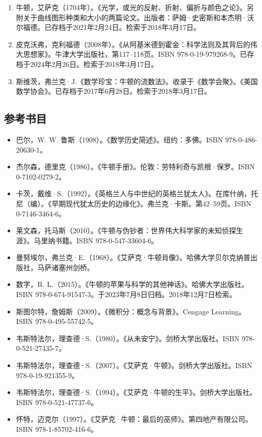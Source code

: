 \begin{enumerate}
\item 牛顿，艾萨克（1704年）。《光学，或光的反射、折射、偏折与颜色之论》。另附关于曲线图形种类和大小的两篇论文。出版者：萨姆·史密斯和本杰明·沃尔福德。已存档于2021年2月24日。检索于2018年3月17日。  
\item 皮克沃弗，克利福德（2008年）。《从阿基米德到霍金：科学法则及其背后的伟大思想家》。牛津大学出版社，第117–118页。ISBN 978-0-19-979268-9。已存档于2024年2月26日。检索于2018年3月17日。  
\item 斯维茨，弗兰克·J.《数学珍宝：牛顿的流数法》。收录于《数学会聚》。《美国数学协会》。已存档于2017年6月28日。检索于2018年3月17日。
\end{enumerate}
\subsection{参考书目}
\begin{itemize}
\item 巴尔，W. W. 鲁斯（1908）。《数学历史简述》。纽约：多佛。ISBN 978-0-486-20630-1。  
\item 杰尔森，德里克（1986）。《牛顿手册》。伦敦：劳特利奇与凯根·保罗。ISBN 0-7102-0279-2。  
\item 卡茨，戴维·S.（1992）。《英格兰人与中世纪的英格兰犹太人》。在库什纳，托尼（编）。《早期现代犹太历史的边缘化》。弗兰克·卡斯。第42–59页。ISBN 0-7146-3464-6。  
\item 莱文森，托马斯（2010）。《牛顿与伪钞者：世界伟大科学家的未知侦探生涯》。马里纳书籍。ISBN 978-0-547-33604-6。  
\item 曼努埃尔，弗兰克·E.（1968）。《艾萨克·牛顿肖像》。哈佛大学贝尔克纳普出版社，马萨诸塞州剑桥。
\item 数字，R. L.（2015）。《牛顿的苹果与科学的其他神话》。哈佛大学出版社。ISBN 978-0-674-91547-3。于2023年7月8日归档。2018年12月7日检索。  
\item 斯图尔特，詹姆斯（2009）。《微积分：概念与背景》。Cengage Learning。ISBN 978-0-495-55742-5。  
\item 韦斯特法尔，理查德·S.（1980）。《从未安宁》。剑桥大学出版社。ISBN 978-0-521-27435-7。  
\item 韦斯特法尔，理查德·S.（2007）。《艾萨克·牛顿》。剑桥大学出版社。ISBN 978-0-19-921355-9。  
\item 韦斯特法尔，理查德·S.（1994）。《艾萨克·牛顿的生平》。剑桥大学出版社。ISBN 978-0-521-47737-6。  
\item 怀特，迈克尔（1997）。《艾萨克·牛顿：最后的巫师》。第四地产有限公司。ISBN 978-1-85702-416-6。
\end{itemize}
